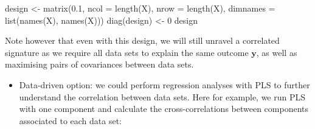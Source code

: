 \documentclass[
]{book}
\newenvironment{Shaded}{\begin{snugshade}}{\end{snugshade}}
\newcommand{\AttributeTok}[1]{\textcolor[rgb]{0.77,0.63,0.00}{#1}}
\newcommand{\DecValTok}[1]{\textcolor[rgb]{0.00,0.00,0.81}{#1}}
\newcommand{\FloatTok}[1]{\textcolor[rgb]{0.00,0.00,0.81}{#1}}
\newcommand{\FunctionTok}[1]{\textcolor[rgb]{0.00,0.00,0.00}{#1}}
\newcommand{\NormalTok}[1]{#1}
\newcommand{\OtherTok}[1]{\textcolor[rgb]{0.56,0.35,0.01}{#1}}
\newcommand{\SpecialCharTok}[1]{\textcolor[rgb]{0.00,0.00,0.00}{#1}}
\providecommand{\tightlist}{%
  \setlength{\itemsep}{0pt}\setlength{\parskip}{0pt}}
\begin{document}
\begin{Shaded}
\begin{Highlighting}[]
\NormalTok{design }\OtherTok{\textless{}{-}} \FunctionTok{matrix}\NormalTok{(}\FloatTok{0.1}\NormalTok{, }\AttributeTok{ncol =} \FunctionTok{length}\NormalTok{(X), }\AttributeTok{nrow =} \FunctionTok{length}\NormalTok{(X), }
                \AttributeTok{dimnames =} \FunctionTok{list}\NormalTok{(}\FunctionTok{names}\NormalTok{(X), }\FunctionTok{names}\NormalTok{(X)))}
\FunctionTok{diag}\NormalTok{(design) }\OtherTok{\textless{}{-}} \DecValTok{0}
\NormalTok{design }
\end{Highlighting}
\end{Shaded}

Note however that even with this design, we will still unravel a correlated signature as we require all data sets to explain the same outcome \(\boldsymbol y\), as well as maximising pairs of covariances between data sets.

\begin{itemize}
\tightlist
\item
  Data-driven option: we could perform regression analyses with PLS to further understand the correlation between data sets. Here for example, we run PLS with one component and calculate the cross-correlations between components associated to each data set:
\end{itemize}

\begin{Shaded}
\end{Shaded}
\end{document}
